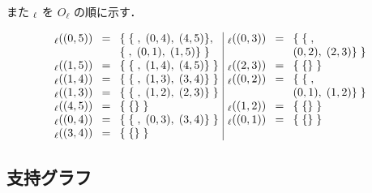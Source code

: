 {\noindent
また $_\ell$ を $O_\ell$ の順に示す．
\begin{small}
\[
{\arraycolsep=4pt
\begin{array}{lll|lll}
\subtrees_\ell(\sym{S}(0,5))&=&
		\{\;
		\{\sym{S}\dto\sym{PP}\;\sym{V},\;
					\sym{PP}(0,4),\;\sym{V}(4,5)\},&
	\subtrees_\ell(\sym{NP}(0,3))&=&
		\{\;\{\sym{NP}\dto\sym{VP}\;\sym{N},\\
&&\q\{\sym{S}\dto\sym{ADV}\;\sym{VP},\;
		\sym{ADV}(0,1),\;\sym{VP}(1,5)\}\;\}&
	&&\q\sym{VP}(0,2),\;\sym{N}(2,3)\}\;\}\\
\subtrees_\ell(\sym{VP}(1,5))&=&
		\{\;\{\sym{VP}\dto\sym{PP}\;\sym{V},\;
				\sym{PP}(1,4),\;\sym{V}(4,5)\}\;\}&
	\subtrees_\ell(\sym{N}(2,3))&=&
		\{\;\{\sym{N}\dto\sym{一郎}\}\;\}\\
\subtrees_\ell(\sym{PP}(1,4))&=&
		\{\;\{\sym{PP}\dto\sym{NP}\;\sym{P},\;
				\sym{NP}(1,3),\;\sym{P}(3,4)\}\;\}&
	\subtrees_\ell(\sym{VP}(0,2))&=&
		\{\;\{\sym{VP}\dto\sym{ADV}\;\sym{V},\\
\subtrees_\ell(\sym{NP}(1,3))&=&
		\{\;\{\sym{NP}\dto\sym{V}\;\sym{N},\;
				\sym{NP}(1,2),\;\sym{N}(2,3)\}\;\}&
		&&\q\sym{ADV}(0,1),\;\sym{V}(1,2)\}\;\}\\
\subtrees_\ell(\sym{V}(4,5))&=&
		\{\;\{\sym{V}\dto\sym{見た}\}\;\}&
	\subtrees_\ell(\sym{V}(1,2))&=&
			\{\;\{\sym{V}\dto\sym{走る}\}\;\}\\
\subtrees_\ell(\sym{PP}(0,4))&=&
		\{\;\{\sym{PP}\dto\sym{NP}\;\sym{P},\;
				\sym{NP}(0,3),\;\sym{P}(3,4)\}\;\}&
	\subtrees_\ell(\sym{ADV}(0,1))&=&
		\{\;\{\sym{ADV}\dto\sym{急いで}\}\;\}\\
\subtrees_\ell(\sym{P}(3,4))&=&
	\{\;\{\sym{P}\dto\sym{を}\}\;\}
\end{array}
}
\]
\end{small}

\subsection{支持グラフ}
\label{sec:GEM:support-graph}

}
